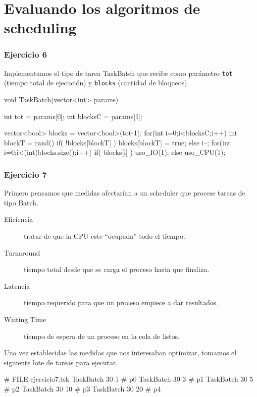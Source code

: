 \part{Evaluando los algoritmos de scheduling}

\section{Ejercicio 6}

Implementamos el tipo de tarea TaskBatch que recibe como par\'ametro \verb|tot| (tiempo total de ejecuci\'on) y \verb|blocks| (cantidad de bloqueos).

\begin{framed}
\begin{verbatimtab}
void TaskBatch(vector<int> params) {
	int tot = params[0];
	int blocksC = params[1];
	
	vector<bool> blocks = vector<bool>(tot-1);
	for(int i=0;i<blocksC;i++) {
		int blockT = rand()%
		if( !blocks[blockT] )
			blocks[blockT] = true;
		else
			i--;
	}
	for(int i=0;i<(int)blocks.size();i++) {
		if( blocks[i] )
			uso_IO(1);
		else
			uso_CPU(1);
	}
}
\end{verbatimtab}
\end{framed}

\section{Ejercicio 7}

Primero pensamos que medidas afectar\'ian a un scheduler que procese tareas de tipo Batch.

\begin{description}
 \item[Eficiencia] tratar de que la CPU este ``ocupada'' todo el tiempo.
 \item[Turnaround] tiempo total desde que se carga el proceso hasta que finaliza.
 \item[Latencia] tiempo requerido para que un proceso empiece a dar resultados.
 \item[Waiting Time] tiempo de espera de un proceso en la cola de listos.
\end{description}

Una vez establecidas las medidas que nos interesaban optimizar, tomamos el siguiente lote de tareas para ejecutar.

\begin{framed}
\begin{verbatimtab}
# FILE ejercicio7.tsk
TaskBatch	 	30  1  # p0
TaskBatch	 	30  3  # p1
TaskBatch	 	30  5  # p2
TaskBatch	 	30 10  # p3
TaskBatch	 	30 20  # p4
\end{verbatimtab}
\end{framed}

